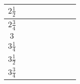 \documentclass{article}
\newcommand{\blk}{\cellcolor{darkgray}}
\newcommand{\red}{\cellcolor{red!33}}
\newcommand{\grn}{\cellcolor{green!33}}
\newcommand{\just}[1]{\boxed{#1}}%
\newcommand{\incl}{\mathbf{incl}}
\newcommand{\excl}{\mathbf{excl}}
\begin{document}
\begin{table}[H]
\begin{tabular}{c||c|c|c|c|c|c|c|}
		$2\frac12$	&	\blk		&	\blk		&	\red\just\excl	&	\grn\just\incl	&	\blk		&	\blk		\\\hline
		$2\frac34$	&	\blk		&	\blk		&	\red\just\excl	&	\grn\just\incl	&	\blk		&	\blk		\\\hline
			$3$	&	\blk		&	\blk		&	\blk		&	\blk		&	\blk		&	\blk		\\\hline
		$3\frac14$	&	\blk		&	\blk		&	\blk		&	\blk		&	\blk		&	\blk		\\\hline
		$3\frac12$	&	\blk		&	\blk		&	\blk		&	\blk		&	\blk		&	\blk		\\\hline
		$3\frac34$	&	\blk		&	\blk		&	\blk		&	\blk		&	\blk		&	\blk		\\\hline
		\end{tabular}
	\end{table}

	\setlength{\extrarowheight}{8px}
\end{document}
